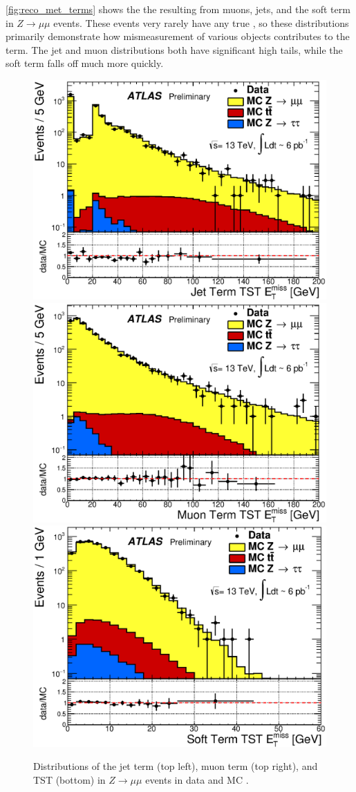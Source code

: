 \autoref{fig:reco_met_terms} shows the the \met resulting from muons, jets, and the soft term in $Z\rightarrow\mu\mu$ events. These events very rarely have any true \met, so these distributions primarily demonstrate how mismeasurement of various objects contributes to the \met term. The jet and muon distributions both have significant high tails, while the soft term falls off much more quickly. 

\begin{centering}
\begin{figure}[!hbt]
\myfloatalign
\includegraphics[width=.48\linewidth]{figures/reco/met_fig_02a.eps}
\includegraphics[width=.48\linewidth]{figures/reco/met_fig_02b.eps}
\includegraphics[width=.48\linewidth]{figures/reco/met_fig_02c.eps}
\caption{ Distributions of the jet term (top left), muon term (top right), and \ac{TST} (bottom) \met in $Z\rightarrow\mu\mu$ events in data and \ac{MC} \cite{ATL-PHYS-PUB-2015-027}. }
\label{fig:reco_met_terms}
\end{figure}
\end{centering}




